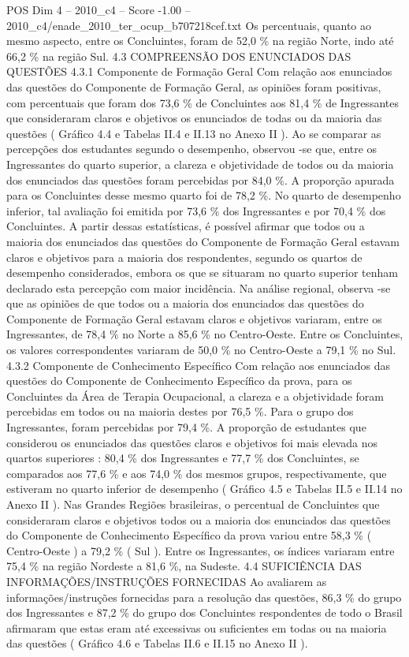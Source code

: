 \begin{textsample}{POS Dim 4 – 2010\_c4 – Score -1.00 – 2010\_c4/enade\_2010\_ter\_ocup\_b707218cef.txt}
Os percentuais, quanto ao mesmo aspecto, entre os Concluintes, foram de 52,0 \% na região Norte, indo até 66,2 \% na região Sul. 4.3 COMPREENSÃO DOS ENUNCIADOS DAS QUESTÕES 4.3.1 Componente de Formação Geral Com relação aos enunciados das questões do Componente de Formação Geral, as opiniões foram positivas, com percentuais que foram dos 73,6 \% de Concluintes aos 81,4 \% de Ingressantes que consideraram claros e objetivos os enunciados de todas ou da maioria das questões ( Gráfico 4.4 e Tabelas II.4 e II.13 no Anexo II ).
Ao se comparar as percepções dos estudantes segundo o desempenho, observou -se que, entre os Ingressantes do quarto superior, a clareza e objetividade de todos ou da maioria dos enunciados das questões foram percebidas por 84,0 \%.
A proporção apurada para os Concluintes desse mesmo quarto foi de 78,2 \%.
No quarto de desempenho inferior, tal avaliação foi emitida por 73,6 \% dos Ingressantes e por 70,4 \% dos Concluintes.
A partir dessas estatísticas, é possível afirmar que todos ou a maioria dos enunciados das questões do Componente de Formação Geral estavam claros e objetivos para a maioria dos respondentes, segundo os quartos de desempenho considerados, embora os que se situaram no quarto superior tenham declarado esta percepção com maior incidência.
Na análise regional, observa -se que as opiniões de que todos ou a maioria dos enunciados das questões do Componente de Formação Geral estavam claros e objetivos variaram, entre os Ingressantes, de 78,4 \% no Norte a 85,6 \% no Centro-Oeste.
Entre os Concluintes, os valores correspondentes variaram de 50,0 \% no Centro-Oeste a 79,1 \% no Sul. 4.3.2 Componente de Conhecimento Específico Com relação aos enunciados das questões do Componente de Conhecimento Específico da prova, para os Concluintes da Área de Terapia Ocupacional, a clareza e a objetividade foram percebidas em todos ou na maioria destes por 76,5 \%.
Para o grupo dos Ingressantes, foram percebidas por 79,4 \%.
A proporção de estudantes que considerou os enunciados das questões claros e objetivos foi mais elevada nos quartos superiores : 80,4 \% dos Ingressantes e 77,7 \% dos Concluintes, se comparados aos 77,6 \% e aos 74,0 \% dos mesmos grupos, respectivamente, que estiveram no quarto inferior de desempenho ( Gráfico 4.5 e Tabelas II.5 e II.14 no Anexo II ).
Nas Grandes Regiões brasileiras, o percentual de Concluintes que consideraram claros e objetivos todos ou a maioria dos enunciados das questões do Componente de Conhecimento Específico da prova variou entre 58,3 \% ( Centro-Oeste ) a 79,2 \% ( Sul ).
Entre os Ingressantes, os índices variaram entre 75,4 \% na região Nordeste a 81,6 \%, na Sudeste. 4.4 SUFICIÊNCIA DAS INFORMAÇÕES/INSTRUÇÕES FORNECIDAS Ao avaliarem as informações/instruções fornecidas para a resolução das questões, 86,3 \% do grupo dos Ingressantes e 87,2 \% do grupo dos Concluintes respondentes de todo o Brasil afirmaram que estas eram até excessivas ou suficientes em todas ou na maioria das questões ( Gráfico 4.6 e Tabelas II.6 e II.15 no Anexo II ).

\end{textsample}
